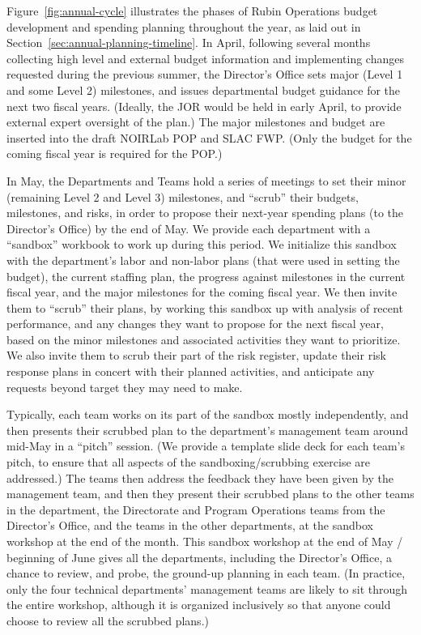 Figure~\ref{fig:annual-cycle} illustrates the phases of \gls{Rubin Operations} budget development and spending planning throughout the year, as laid out in Section~\ref{sec:annual-planning-timeline}.
In April, following several months collecting high level and external budget information and implementing changes requested during the previous summer, the \gls{Director}'s Office sets major (Level 1 and some Level 2) milestones, and issues departmental budget guidance for the next two fiscal years.
(Ideally, the \gls{JOR} would be held in early April, to provide external expert oversight of the plan.)
The major milestones and budget are inserted into the draft \gls{NOIRLab} \gls{POP} and \gls{SLAC} FWP.
(Only the budget for the coming fiscal year is required for the \gls{POP}.)

In May, the Departments and Teams hold a series of meetings to set their minor (remaining Level 2 and Level 3) milestones, and ``scrub'' their budgets, milestones, and risks, in order to propose their next-year spending plans (to the \gls{Director}'s Office) by the end of May.
We provide each department with a ``sandbox'' workbook to work up during this period.
We initialize this sandbox with the department's labor and non-labor plans (that were used in setting the budget), the current staffing plan, the progress against milestones in the current fiscal year, and the major milestones for the coming fiscal year.
We then invite them to ``scrub'' their plans, by working this sandbox up with analysis of recent performance, and any changes they want to propose for the next fiscal year, based on the minor milestones and associated activities they want to prioritize.
We also invite them to scrub their part of the risk register, update their risk response plans in concert with their planned activities, and anticipate any requests beyond target they may need to make.

Typically, each team works on its part of the sandbox mostly independently, and then presents their scrubbed plan to the department's management team around mid-May in a ``pitch'' session.
(We provide a template slide deck for each team's pitch, to ensure that all aspects of the sandboxing/scrubbing exercise are addressed.)
The teams then address the feedback they have been given by the management team, and then they present their scrubbed plans to the other teams in the department, the Directorate and Program \gls{Operations} teams from the \gls{Director}'s Office, and the teams in the other departments, at the sandbox workshop at the end of the month.
This sandbox workshop at the end of May / beginning of June gives all the departments, including the \gls{Director}'s Office, a chance to review, and probe, the ground-up planning in each team.
(In practice, only the four technical departments' management teams are likely to sit through the entire workshop, although it is organized inclusively so that anyone could choose to review all the scrubbed plans.)

